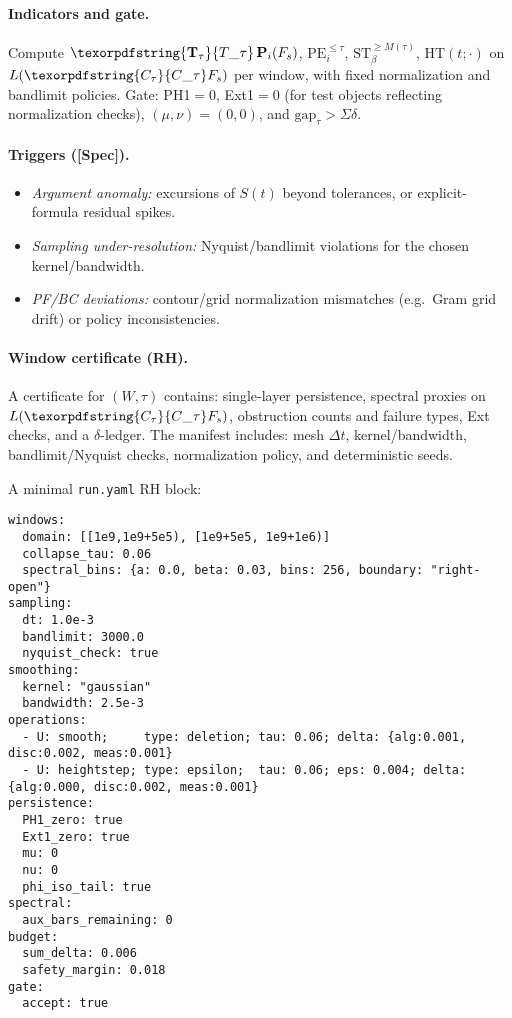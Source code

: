 \documentclass[11pt]{article}
\numberwithin{equation}{section}
\theoremstyle{plain}
\theoremstyle{definition}
\theoremstyle{remark}
\DeclareRobustCommand{\hyp}{\nobreakdash-}
\theoremstyle{plain}
\theoremstyle{definition}
\numberwithin{equation}{section}
\theoremstyle{definition}
\DeclareRobustCommand{\Ttau}{\texorpdfstring{\ensuremath{\mathbf{T}_{\tau}}}{T\_\tau}}
\DeclareRobustCommand{\Ctau}{\texorpdfstring{\ensuremath{C_{\tau}}}{C\_\tau}}
\numberwithin{equation}{section}
\theoremstyle{plain}
\theoremstyle{definition}
\theoremstyle{remark}
\providecommand{\Cfun}[1]{\mathsf{C}_{#1}}
\providecommand{\Tfun}[1]{\mathbf{T}_{#1}}
\providecommand{\Ctau}{\Cfun{\tau}}
\providecommand{\Ttau}{\Tfun{\tau}}
\begin{document}
\paragraph{Indicators and gate.}
Compute \(\Ttau\,\mathbf{P}_i(F_s)\), \(\mathrm{PE}_i^{\le\tau}\), \(\mathrm{ST}_\beta^{\ge M(\tau)}\), \(\mathrm{HT}(t;\cdot)\) on \(L(\Ctau F_s)\) per window, with fixed normalization and bandlimit policies.
Gate: PH1\(=0\), Ext1\(=0\) (for test objects reflecting normalization checks), \((\mu,\nu)=(0,0)\), and \(\mathrm{gap}_\tau>\Sigma\delta\).

\paragraph{Triggers ([Spec]).}
\begin{itemize}
  \item \emph{Argument anomaly:} excursions of \(S(t)\) beyond tolerances, or explicit\hyp formula residual spikes.
  \item \emph{Sampling under\hyp resolution:} Nyquist/bandlimit violations for the chosen kernel/bandwidth.
  \item \emph{PF/BC deviations:} contour/grid normalization mismatches (e.g.\ Gram grid drift) or policy inconsistencies.
\end{itemize}

\paragraph{Window certificate (RH).}
A certificate for \((W,\tau)\) contains: single\hyp layer persistence, spectral proxies on \(L(\Ctau F_s)\), obstruction counts and failure types, Ext checks, and a \(\delta\)\hyp ledger. The manifest includes: mesh \(\Delta t\), kernel/bandwidth, bandlimit/Nyquist checks, normalization policy, and deterministic seeds.

\noindent A minimal \texttt{run.yaml} RH block:

\begin{verbatim}
windows:
  domain: [[1e9,1e9+5e5), [1e9+5e5, 1e9+1e6)]
  collapse_tau: 0.06
  spectral_bins: {a: 0.0, beta: 0.03, bins: 256, boundary: "right-open"}
sampling:
  dt: 1.0e-3
  bandlimit: 3000.0
  nyquist_check: true
smoothing:
  kernel: "gaussian"
  bandwidth: 2.5e-3
operations:
  - U: smooth;     type: deletion; tau: 0.06; delta: {alg:0.001, disc:0.002, meas:0.001}
  - U: heightstep; type: epsilon;  tau: 0.06; eps: 0.004; delta: {alg:0.000, disc:0.002, meas:0.001}
persistence:
  PH1_zero: true
  Ext1_zero: true
  mu: 0
  nu: 0
  phi_iso_tail: true
spectral:
  aux_bars_remaining: 0
budget:
  sum_delta: 0.006
  safety_margin: 0.018
gate:
  accept: true
\end{verbatim}
\end{document}
